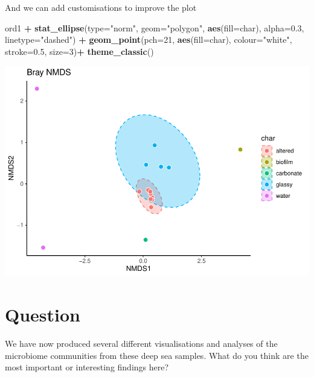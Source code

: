 \documentclass[
]{book}
\newenvironment{Shaded}{\begin{snugshade}}{\end{snugshade}}
\newcommand{\AttributeTok}[1]{\textcolor[rgb]{0.13,0.29,0.53}{#1}}
\newcommand{\DecValTok}[1]{\textcolor[rgb]{0.00,0.00,0.81}{#1}}
\newcommand{\FloatTok}[1]{\textcolor[rgb]{0.00,0.00,0.81}{#1}}
\newcommand{\FunctionTok}[1]{\textcolor[rgb]{0.13,0.29,0.53}{\textbf{#1}}}
\newcommand{\NormalTok}[1]{#1}
\newcommand{\SpecialCharTok}[1]{\textcolor[rgb]{0.81,0.36,0.00}{\textbf{#1}}}
\newcommand{\StringTok}[1]{\textcolor[rgb]{0.31,0.60,0.02}{#1}}
\begin{document}
And we can add customisations to improve the plot

\begin{Shaded}
\begin{Highlighting}[]
\NormalTok{ord1 }\SpecialCharTok{+} \FunctionTok{stat\_ellipse}\NormalTok{(}\AttributeTok{type=}\StringTok{"norm"}\NormalTok{,}
                    \AttributeTok{geom=}\StringTok{"polygon"}\NormalTok{,}
                    \FunctionTok{aes}\NormalTok{(}\AttributeTok{fill=}\NormalTok{char),}
                    \AttributeTok{alpha=}\FloatTok{0.3}\NormalTok{,}
                    \AttributeTok{linetype=}\StringTok{"dashed"}\NormalTok{) }\SpecialCharTok{+}
     \FunctionTok{geom\_point}\NormalTok{(}\AttributeTok{pch=}\DecValTok{21}\NormalTok{, }\FunctionTok{aes}\NormalTok{(}\AttributeTok{fill=}\NormalTok{char), }\AttributeTok{colour=}\StringTok{"white"}\NormalTok{, }\AttributeTok{stroke=}\FloatTok{0.5}\NormalTok{, }\AttributeTok{size=}\DecValTok{3}\NormalTok{)}\SpecialCharTok{+}
        \FunctionTok{theme\_classic}\NormalTok{()}
\end{Highlighting}
\end{Shaded}

\includegraphics{bookdown-demo_files/figure-latex/unnamed-chunk-77-1.pdf}

\hypertarget{question}{%
\section{Question}\label{question}}

We have now produced several different visualisations and analyses of the microbiome communities from these deep sea samples.
What do you think are the most important or interesting findings here?
\end{document}
